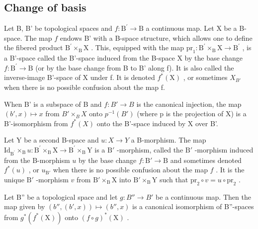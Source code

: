 \subsection{Change of basis}

Let B, B' be topological spaces and \(f\colon\mathrm{B}^{\prime}\to\mathrm{B}\) a continuous map. Let X be a B-space. The map \(f\) endows B' with a B-space structure, which allows one to define the fibered product \(\mathrm{B}^{\prime}\times_{\mathrm{B}}\mathrm{X}\) . This, equipped with the map \(\mathrm{pr}_{1}\colon\mathrm{B}^{\prime}\times_{\mathrm{B}}\mathrm{X}\to\mathrm{B}^{\prime}\) , is a B'-space called the B'-space induced from the B-space X by the base change \(f\colon\mathrm{B}^{\prime}\to\mathrm{B}\) (or by the base change from B to B' along f). It is also called the inverse-image B'-space of X under f. It is denoted \(f^{*}(\mathrm{X})\) , or sometimes \(X_{B'}\) when there is no possible confusion about the map f.

When B' is a subspace of B and \(f: B' \to B\) is the canonical injection, the map \((b', x) \mapsto x\) from \(B' \times_{B} X\) onto \(p^{-1}(B')\) (where p is the projection of X) is a B'-isomorphism from \(f^{*}(X)\) onto the B'-space induced by X over B'.

Let Y be a second B-space and \(u\colon X\to Y\) a B-morphism. The map \(\mathrm{Id}_{\mathrm{B}^{\prime}}\times_{\mathrm{B}}u\colon \mathrm{B}^{\prime}\times_{\mathrm{B}}\mathrm{X}\to \mathrm{B}^{\prime}\times_{\mathrm{B}}\mathrm{Y}\) is a \(\mathrm{B}'\) -morphism, called the \(\mathrm{B}'\) -morphism induced from the B-morphism \(u\) by the base change \(f\colon \mathrm{B}'\to \mathrm{B}\) and sometimes denoted \(f^{*}(u)\) , or \(u_{\mathrm{B}'}\) when there is no possible confusion about the map \(f\) . It is the unique \(\mathrm{B}'\) -morphism \(v\) from \(\mathrm{B}'\times_{\mathrm{B}}\mathrm{X}\) into \(\mathrm{B}'\times_{\mathrm{B}}\mathrm{Y}\) such that \(\mathrm{pr}_2\circ v = u\circ \mathrm{pr}_2\) .

Let B'' be a topological space and let \(g: B'' \to B'\) be a continuous map. Then the map given by \((b'', (b', x)) \mapsto (b'', x)\) is a canonical isomorphism of B''-spaces from \(g^{*}(f^{*}(\mathrm{X}))\) onto \((f \circ g)^{*}(\mathrm{X})\) .

